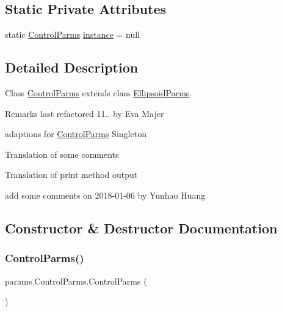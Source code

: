 \subsection*{Static Private Attributes}
\begin{DoxyCompactItemize}
\item 
static \hyperlink{classparams_1_1_control_parms}{Control\+Parms} \hyperlink{classparams_1_1_control_parms_ae1673336e84a96b7c381c651f5e1c57a}{instance} = null
\end{DoxyCompactItemize}


\subsection{Detailed Description}
Class \hyperlink{classparams_1_1_control_parms}{Control\+Parms} extends class \hyperlink{classparams_1_1_ellipsoid_parms}{Ellipsoid\+Parms}. 

\begin{DoxyRemark}{Remarks}
last refactored 11.. by Eva Majer ~\newline
 
\begin{DoxyItemize}
\item adaptions for \hyperlink{classparams_1_1_control_parms}{Control\+Parms} Singleton 
\item Translation of some comments 
\item Translation of print method output 
\end{DoxyItemize}

add some comments on 2018-\/01-\/06 by Yunhao Huang 
\end{DoxyRemark}


\subsection{Constructor \& Destructor Documentation}
\mbox{\label{classparams_1_1_control_parms_a8684e9cf600ad6c4356eeca30133b147}} 
\subsubsection{\texorpdfstring{Control\+Parms()}{ControlParms()}}
{\footnotesize\ttfamily params.\+Control\+Parms.\+Control\+Parms (\begin{DoxyParamCaption}{ }\end{DoxyParamCaption})\hspace{0.3cm}{\ttfamily [private]}}



